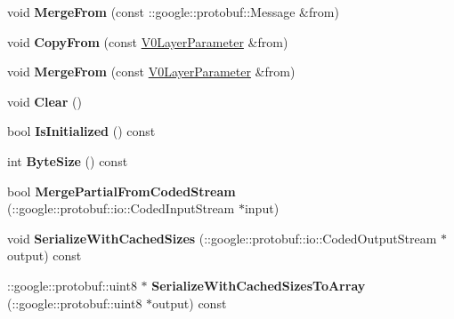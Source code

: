 \begin{DoxyCompactItemize}
\mbox{\label{classcaffe_1_1_v0_layer_parameter_a340450f22fda635630dafcaff975446a}} 
void {\bfseries Merge\+From} (const \+::google\+::protobuf\+::\+Message \&from)
\item 
\mbox{\label{classcaffe_1_1_v0_layer_parameter_ad56ed9ca69b0f22ceec526352adfeea4}} 
void {\bfseries Copy\+From} (const \mbox{\hyperlink{classcaffe_1_1_v0_layer_parameter}{V0\+Layer\+Parameter}} \&from)
\item 
\mbox{\label{classcaffe_1_1_v0_layer_parameter_a256d870d86dd5cd7439b8d57c7475915}} 
void {\bfseries Merge\+From} (const \mbox{\hyperlink{classcaffe_1_1_v0_layer_parameter}{V0\+Layer\+Parameter}} \&from)
\item 
\mbox{\label{classcaffe_1_1_v0_layer_parameter_ac2b081c150b290a017a55879ecd0c51c}} 
void {\bfseries Clear} ()
\item 
\mbox{\label{classcaffe_1_1_v0_layer_parameter_ad0da61073143b1360c0e966682eb7d4b}} 
bool {\bfseries Is\+Initialized} () const
\item 
\mbox{\label{classcaffe_1_1_v0_layer_parameter_acb90a5ae7b179924e0208e199a7dc4c2}} 
int {\bfseries Byte\+Size} () const
\item 
\mbox{\label{classcaffe_1_1_v0_layer_parameter_aa4c25d014f9d2087b5be6238fed39446}} 
bool {\bfseries Merge\+Partial\+From\+Coded\+Stream} (\+::google\+::protobuf\+::io\+::\+Coded\+Input\+Stream $\ast$input)
\item 
\mbox{\label{classcaffe_1_1_v0_layer_parameter_aca7b959b29351751679410410a495353}} 
void {\bfseries Serialize\+With\+Cached\+Sizes} (\+::google\+::protobuf\+::io\+::\+Coded\+Output\+Stream $\ast$output) const
\item 
\mbox{\label{classcaffe_1_1_v0_layer_parameter_a7378c200ac404f2a6063135c2a0076dc}} 
\+::google\+::protobuf\+::uint8 $\ast$ {\bfseries Serialize\+With\+Cached\+Sizes\+To\+Array} (\+::google\+::protobuf\+::uint8 $\ast$output) const

\end{DoxyCompactItemize}
